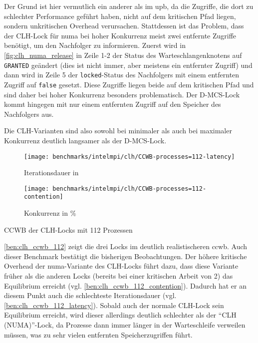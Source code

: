 Der Grund ist hier vermutlich ein anderer als im \gls{upb},
da die Zugriffe,
die dort zu schlechter Performance geführt haben,
nicht auf dem kritischen Pfad liegen,
sondern unkritischen Overhead verursachen.
Stattdessen ist das Problem,
dass der CLH-Lock für \gls{numa} bei hoher \gls{Konkurrenz} meist zwei entfernte Zugriffe benötigt,
um den Nachfolger zu informieren.
Zuerst wird in \autoref{fig:clh_numa_release} in Zeile 1-2 der Status des Warteschlangenknotens auf \texttt{GRANTED} geändert
(dies ist nicht immer, aber meistens ein entfernter Zugriff)
und dann wird in Zeile 5 der \texttt{locked}-Status des Nachfolgers
mit einem entfernten Zugriff
auf \texttt{false} gesetzt.
Diese Zugriffe liegen beide auf dem kritischen Pfad und sind daher bei hoher \gls{Konkurrenz} besonders problematisch.
Der D-MCS-Lock kommt hingegen mit nur einem entfernten Zugriff auf den Speicher des Nachfolgers aus.

Die CLH-Varianten sind also sowohl bei minimaler
als auch bei maximaler \gls{Konkurrenz} deutlich langsamer
als der D-MCS-Lock.

\begin{benchmark}[h]
    \begin{subfigure}{.5\textwidth}
        \texttt{[image: benchmarks/intelmpi/clh/CCWB-processes=112-latency]}
        \caption{Iterationsdauer in }
        \label{ben:clh_ccwb_112_latency}
    \end{subfigure}
    \begin{subfigure}{.5\textwidth}
        \texttt{[image: benchmarks/intelmpi/clh/CCWB-processes=112-contention]}
        \caption{Konkurrenz in \%}
        \label{ben:clh_ccwb_112_contention}
    \end{subfigure}
    \caption{CCWB der CLH-Locks mit 112 Prozessen}
    \label{ben:clh_ccwb_112}
\end{benchmark}

\autoref{ben:clh_ccwb_112} zeigt die drei Locks im deutlich realistischeren \gls{ccwb}.
Auch dieser Benchmark bestätigt die bisherigen Beobachtungen.
Der höhere kritische Overhead der \gls{numa}-Variante des CLH-Locks führt dazu,
dass diese Variante früher als die anderen Locks
(bereits bei einer kritischen Arbeit von 2)
das Equilibrium erreicht
(vgl. \autoref{ben:clh_ccwb_112_contention}).
Dadurch hat er an diesem Punkt auch die schlechteste Iterationsdauer
(vgl. \autoref{ben:clh_ccwb_112_latency}).
Sobald auch der normale CLH-Lock sein Equilibrium erreicht,
wird dieser allerdings deutlich schlechter
als der \enquote{CLH (NUMA)}-Lock,
da Prozesse dann immer länger in der Warteschleife verweilen müssen,
was zu sehr vielen entfernten Speicherzugriffen führt.

